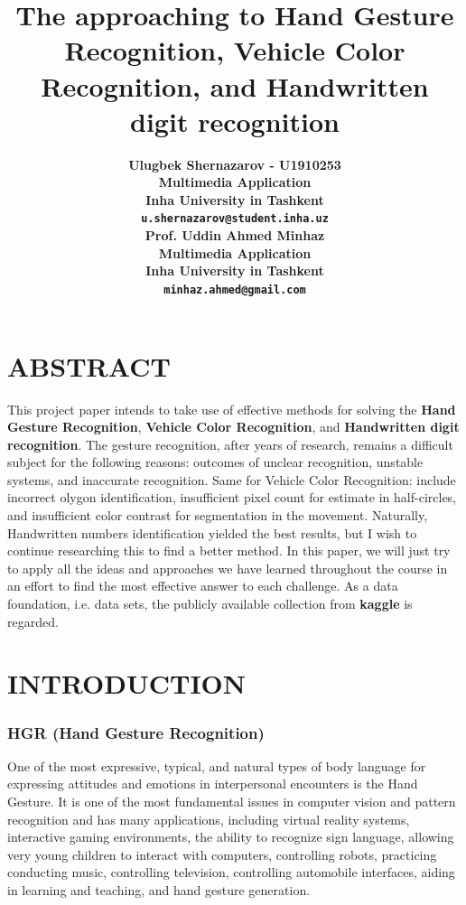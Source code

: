 \documentclass[letterpaper, 10 pt, conference]{ieeeconf}  %
\title{\LARGE \bf
The approaching to Hand Gesture Recognition, Vehicle Color Recognition, and Handwritten digit recognition
}
\author{ \parbox{3 in}{\centering \bf Ulugbek Shernazarov - U1910253
        \\ Multimedia Application\\
        Inha University in Tashkent\\
        {\tt\small u.shernazarov@student.inha.uz}}
        \hspace*{ 0.5 in}
        \parbox{3 in}{ \centering \bf Prof. Uddin Ahmed Minhaz
        \\ Multimedia Application\\
        Inha University in Tashkent \\
        {\tt\small 	minhaz.ahmed@gmail.com}}
}
\begin{document}
\maketitle
\thispagestyle{plain}
\pagestyle{plain}



\section{\bf ABSTRACT}

This project paper intends to take use of effective methods for solving the {\bf Hand Gesture Recognition}, {\bf Vehicle Color Recognition}, and {\bf Handwritten digit recognition}. The gesture recognition, after years of research, remains a difficult subject for the following reasons: outcomes of unclear recognition, unstable systems, and inaccurate recognition. Same for Vehicle Color Recognition: include incorrect olygon identification, insufficient pixel count for estimate in half-circles, and insufficient color contrast for segmentation in the movement. Naturally, Handwritten numbers identification yielded the best results, but I wish to continue researching this to find a better method. In this paper, we will just try to apply all the ideas and approaches we have learned throughout the course in an effort to find the most effective answer to each challenge. As a data foundation, i.e. data sets, the publicly available collection from {\bf kaggle} is regarded.\\

\section{\bf INTRODUCTION}

\subsubsection*{\bf HGR (Hand Gesture Recognition)}

One of the most expressive, typical, and natural types of body language for expressing attitudes and emotions in interpersonal encounters is the Hand Gesture. It is one of the most fundamental issues in computer vision and pattern recognition and has many applications, including virtual reality systems, interactive gaming environments, the ability to recognize sign language, allowing very young children to interact with computers, controlling robots, practicing conducting music, controlling television, controlling automobile interfaces, aiding in learning and teaching, and hand gesture generation. \par
\end{document}
